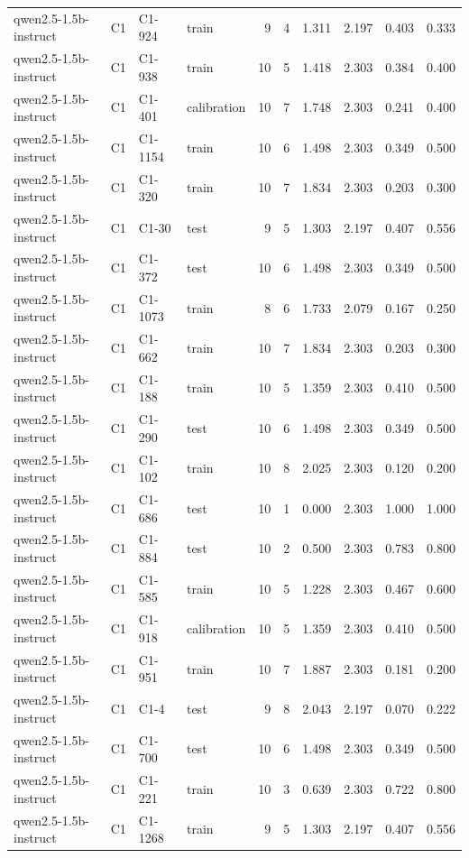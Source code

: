 \begin{table}
\begin{tabular}{llllrrrrrr}
qwen2.5-1.5b-instruct & C1 & C1-924 & train & 9 & 4 & 1.311 & 2.197 & 0.403 & 0.333 \\
qwen2.5-1.5b-instruct & C1 & C1-938 & train & 10 & 5 & 1.418 & 2.303 & 0.384 & 0.400 \\
qwen2.5-1.5b-instruct & C1 & C1-401 & calibration & 10 & 7 & 1.748 & 2.303 & 0.241 & 0.400 \\
qwen2.5-1.5b-instruct & C1 & C1-1154 & train & 10 & 6 & 1.498 & 2.303 & 0.349 & 0.500 \\
qwen2.5-1.5b-instruct & C1 & C1-320 & train & 10 & 7 & 1.834 & 2.303 & 0.203 & 0.300 \\
qwen2.5-1.5b-instruct & C1 & C1-30 & test & 9 & 5 & 1.303 & 2.197 & 0.407 & 0.556 \\
qwen2.5-1.5b-instruct & C1 & C1-372 & test & 10 & 6 & 1.498 & 2.303 & 0.349 & 0.500 \\
qwen2.5-1.5b-instruct & C1 & C1-1073 & train & 8 & 6 & 1.733 & 2.079 & 0.167 & 0.250 \\
qwen2.5-1.5b-instruct & C1 & C1-662 & train & 10 & 7 & 1.834 & 2.303 & 0.203 & 0.300 \\
qwen2.5-1.5b-instruct & C1 & C1-188 & train & 10 & 5 & 1.359 & 2.303 & 0.410 & 0.500 \\
qwen2.5-1.5b-instruct & C1 & C1-290 & test & 10 & 6 & 1.498 & 2.303 & 0.349 & 0.500 \\
qwen2.5-1.5b-instruct & C1 & C1-102 & train & 10 & 8 & 2.025 & 2.303 & 0.120 & 0.200 \\
qwen2.5-1.5b-instruct & C1 & C1-686 & test & 10 & 1 & 0.000 & 2.303 & 1.000 & 1.000 \\
qwen2.5-1.5b-instruct & C1 & C1-884 & test & 10 & 2 & 0.500 & 2.303 & 0.783 & 0.800 \\
qwen2.5-1.5b-instruct & C1 & C1-585 & train & 10 & 5 & 1.228 & 2.303 & 0.467 & 0.600 \\
qwen2.5-1.5b-instruct & C1 & C1-918 & calibration & 10 & 5 & 1.359 & 2.303 & 0.410 & 0.500 \\
qwen2.5-1.5b-instruct & C1 & C1-951 & train & 10 & 7 & 1.887 & 2.303 & 0.181 & 0.200 \\
qwen2.5-1.5b-instruct & C1 & C1-4 & test & 9 & 8 & 2.043 & 2.197 & 0.070 & 0.222 \\
qwen2.5-1.5b-instruct & C1 & C1-700 & test & 10 & 6 & 1.498 & 2.303 & 0.349 & 0.500 \\
qwen2.5-1.5b-instruct & C1 & C1-221 & train & 10 & 3 & 0.639 & 2.303 & 0.722 & 0.800 \\
qwen2.5-1.5b-instruct & C1 & C1-1268 & train & 9 & 5 & 1.303 & 2.197 & 0.407 & 0.556 \\

\end{tabular}
\end{table}
